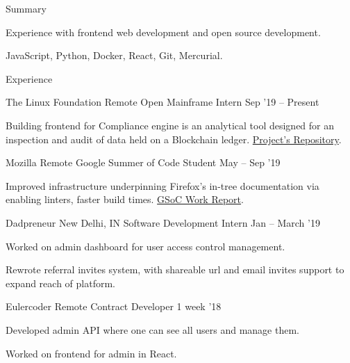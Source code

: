 \documentclass{resume} %
\begin{document}

\begin{rSection}{Summary}
  \begin{rSummarySection}
  {
    \item Experience with frontend web development and open source development.
    \item JavaScript, Python, Docker, React, Git, Mercurial.
  }
  \end{rSummarySection}
\end{rSection}


\begin{rSection}{Experience}
  \begin{rWorkSection}{The Linux Foundation}
                           {Remote}
                           {Open Mainframe Intern}
                           {Sep '19 -- Present}
  {
    \item Building frontend for Compliance engine is an analytical tool designed for an inspection and audit of data held on a Blockchain ledger. \href{https://github.com/openmainframeproject-internship/Compliance-Engine-2019/}{Project's Repository}.
  }
  \end{rWorkSection}

  \begin{rWorkSection}{Mozilla}
                      {Remote}
                      {Google Summer of Code Student}
                      {May -- Sep '19}
  {
    \item Improved infrastructure underpinning Firefox's in-tree documentation via enabling linters, faster build times. \href{http://bit.ly/GSoC19FF}{GSoC Work Report}.
  }
  \end{rWorkSection}

  \begin{rWorkSection}{Dadpreneur}
                     {New Delhi, IN}
                     {Software Development Intern}
                     {Jan -- March '19}
  {
    \item Worked on admin dashboard for user access control management.
    \item Rewrote referral invites system, with shareable url and email invites support to expand reach of platform.
  }
  \end{rWorkSection}

  \begin{rWorkSection}{Eulercoder}
                     {Remote}
                     {Contract Developer}
                     {1 week '18}
  {
    \item Developed admin API where one can see all users and manage them.
    \item Worked on frontend for admin in React.
  }
  \end{rWorkSection}
\end{rSection}
\end{document}

